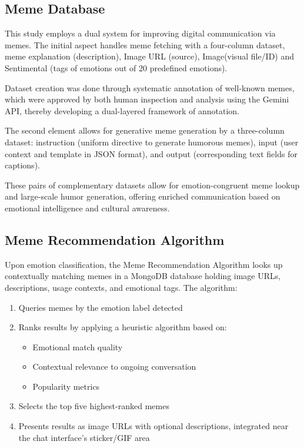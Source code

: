\documentclass[conference]{IEEEtran}
\begin{document}
\subsection{Meme Database}
This study employs a dual system for improving digital communication via memes. The initial aspect handles meme fetching with a four-column dataset, meme explanation (description), Image URL (source), Image(visual file/ID) and Sentimental (tags of emotions out of 20 predefined emotions).

Dataset creation was done through systematic annotation of well-known memes, which were approved by both human inspection and analysis using the Gemini API, thereby developing a dual-layered framework of annotation.

The second element allows for generative meme generation by a three-column dataset: instruction (uniform directive to generate humorous memes), input (user context and template in JSON format), and output (corresponding text fields for captions).

These pairs of complementary datasets allow for emotion-congruent meme lookup and large-scale humor generation, offering enriched communication based on emotional intelligence and cultural awareness.

\subsection{Meme Recommendation Algorithm}
Upon emotion classification, the Meme Recommendation Algorithm looks up contextually matching memes in a MongoDB database holding image URLs, descriptions, usage contexts, and emotional tags. The algorithm:
\begin{enumerate}
    \item Queries memes by the emotion label detected
    \item Ranks results by applying a heuristic algorithm based on:
    \begin{itemize}
        \item Emotional match quality
        \item Contextual relevance to ongoing conversation
        \item Popularity metrics
    \end{itemize}
    \item Selects the top five highest-ranked memes
    \item Presents results as image URLs with optional descriptions, integrated near the chat interface’s sticker/GIF area
\end{enumerate}
\end{document}
